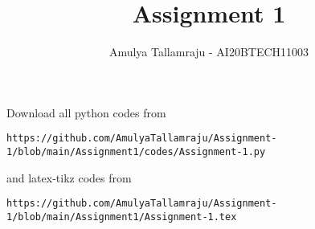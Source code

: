 \documentclass[journal,12pt,twocolumn]{IEEEtran}
\DeclareMathOperator*{\Res}{Res}
\begin{document}
\newcommand{\BEQA}{\begin{eqnarray}}
\newcommand{\EEQA}{\end{eqnarray}}
\newcommand{\define}{\stackrel{\triangle}{=}}

\raggedbottom
\setlength{\parindent}{0pt}
\providecommand{\mbf}{\mathbf}
\providecommand{\pr}[1]{\ensuremath{\Pr\left(#1\right)}}
\providecommand{\qfunc}[1]{\ensuremath{Q\left(#1\right)}}
\providecommand{\sbrak}[1]{\ensuremath{{}\left[#1\right]}}
\providecommand{\lsbrak}[1]{\ensuremath{{}\left[#1\right.}}
\providecommand{\rsbrak}[1]{\ensuremath{{}\left.#1\right]}}
\providecommand{\brak}[1]{\ensuremath{\left(#1\right)}}
\providecommand{\lbrak}[1]{\ensuremath{\left(#1\right.}}
\providecommand{\rbrak}[1]{\ensuremath{\left.#1\right)}}
\providecommand{\cbrak}[1]{\ensuremath{\left\{#1\right\}}}
\providecommand{\lcbrak}[1]{\ensuremath{\left\{#1\right.}}
\providecommand{\rcbrak}[1]{\ensuremath{\left.#1\right\}}}
\theoremstyle{remark}
\newtheorem{rem}{Remark}
\newcommand{\sgn}{\mathop{\mathrm{sgn}}}
\providecommand{\abs}[1]{\vert#1\vert}
\providecommand{\res}[1]{\Res\displaylimits_{#1}} 
\providecommand{\norm}[1]{\lVert#1\rVert}
\providecommand{\mtx}[1]{\mathbf{#1}}
\providecommand{\mean}[1]{E[ #1 ]}
\providecommand{\fourier}{\overset{\mathcal{F}}{ \rightleftharpoons}}
\providecommand{\system}{\overset{\mathcal{H}}{ \longleftrightarrow}}
\newcommand{\solution}{\noindent \textbf{Solution: }}
\newcommand{\cosec}{\,\text{cosec}\,}
\providecommand{\dec}[2]{\ensuremath{\overset{#1}{\underset{#2}{\gtrless}}}}
\newcommand{\myvec}[1]{\ensuremath{\begin{pmatrix}#1\end{pmatrix}}}
\newcommand{\mydet}[1]{\ensuremath{\begin{vmatrix}#1\end{vmatrix}}}
\makeatletter
{}
\makeatother
\let\StandardTheFigure\thefigure
\let\vec\mathbf
\renewcommand{\thefigure}{\theproblem}
\def\putbox#1#2#3{\makebox[0in][l]{\makebox[#1][l]{}\raisebox{\baselineskip}[0in][0in]{\raisebox{#2}[0in][0in]{#3}}}}
     \def\rightbox#1{\makebox[0in][r]{#1}}
     \def\centbox#1{\makebox[0in]{#1}}
     \def\topbox#1{\raisebox{-\baselineskip}[0in][0in]{#1}}
     \def\midbox#1{\raisebox{-0.5\baselineskip}[0in][0in]{#1}}
\vspace{3cm}
\title{Assignment 1}%
\author{Amulya Tallamraju - AI20BTECH11003}
\maketitle
\newpage
\bigskip
\renewcommand{\thefigure}{\theenumi}
\renewcommand{\thetable}{\theenumi}
Download all python codes from 
\begin{lstlisting}
https://github.com/AmulyaTallamraju/Assignment-1/blob/main/Assignment1/codes/Assignment-1.py
\end{lstlisting}
%
and latex-tikz codes from 
%
\begin{lstlisting}
https://github.com/AmulyaTallamraju/Assignment-1/blob/main/Assignment1/Assignment-1.tex
\end{lstlisting}
\end{document}
